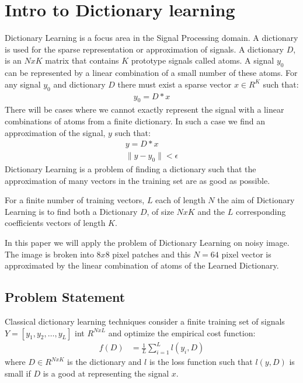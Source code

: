 \documentclass{article} %
\begin{document}
\section{Intro to Dictionary learning}
Dictionary Learning is a focus area in the Signal Processing domain. A dictionary is used for the sparse representation or approximation of signals. A dictionary $D$, is an $NxK$ matrix that contains $K$ prototype signals called atoms. A signal $y_0$ can be represented by a linear combination of a small number of these atoms. For any signal $y_0$ and dictionary $D$ there must exist a sparse vector $x \in R^K$ such that:
\begin{align}
y_0 = D*x
\end{align}   
There will be cases where we cannot exactly represent the signal with a linear combinations of atoms from a finite dictionary. In such a case we find an approximation of the signal, $y$ such that:
\begin{align}
y = D*x \\
\|y - y_0\| < \epsilon
\end{align} 
Dictionary Learning is a problem of finding a dictionary such that the approximation of many vectors in the training set are as good as possible. 

For a finite number of training vectors, $L$ each of length $N$ the aim of Dictionary Learning is to find both a Dictionary $D$, of size $NxK$ and the $L$ corresponding coefficients vectors of length $K$.

In this paper we will apply the problem of Dictionary Learning on noisy image. The image is broken into $8x8$ pixel patches and this $N = 64$ pixel vector is approximated by the linear combination of atoms of the Learned Dictionary.


\subsection{Problem Statement}
Classical dictionary learning techniques consider a finite training set of signals $Y = [y_1, y_2, \ldots, y_L]$ int $R^{NxL}$ and optimize the empirical cost function:
\begin{align}
f(D) &= \frac{1}{L}\sum_{i=1}^{L}l(y_i, D)
\end{align} 
where $D \in R^{NxK}$ is the dictionary and $l$ is the loss function such that $l(y,D)$ is small if $D$ is a good at representing the signal $x$. 
\end{document}
